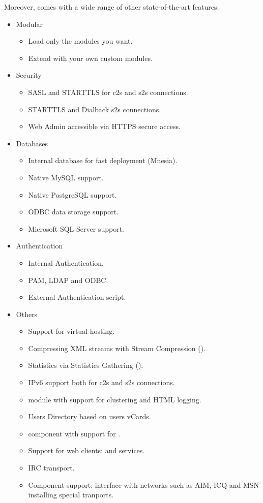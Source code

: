 Moreover, \ejabberd{} comes with a wide range of other state-of-the-art features:
\begin{itemize}
\item Modular
\begin{itemize}
\item Load only the modules you want.
\item Extend \ejabberd{} with your own custom modules.
\end{itemize}
\item Security
\begin{itemize}
\item SASL and STARTTLS for c2s and s2s connections.
\item STARTTLS and Dialback s2s connections.
\item Web Admin accessible via HTTPS secure access.
\end{itemize}
\item Databases
\begin{itemize}
\item Internal database for fast deployment (Mnesia).
\item Native MySQL support.
\item Native PostgreSQL support.
\item ODBC data storage support.
\item Microsoft SQL Server support. %
\end{itemize}
\item Authentication
\begin{itemize}
\item Internal Authentication.
\item PAM, LDAP and ODBC.  %
\item External Authentication script.
\end{itemize}
\item Others
\begin{itemize}
\item Support for virtual hosting.
\item Compressing XML streams with Stream Compression ().
\item Statistics via Statistics Gathering ().
\item IPv6 support both for c2s and s2s connections.
\item {} module with support for clustering and HTML logging. %
\item Users Directory based on users vCards.
\item {} component with support for .
\item Support for web clients:  and  services.
\item IRC transport.
\item Component support: interface with networks such as AIM, ICQ and MSN installing special tranports.
\end{itemize}
\end{itemize}
